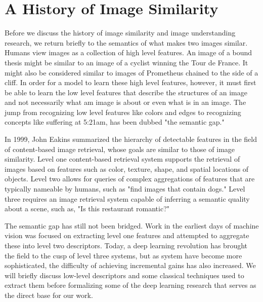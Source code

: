 
\section{A History of Image Similarity}

Before we discuss the history of image similarity and image understanding research, we return briefly to the semantics of what makes two images similar. Humans view images as a collection of high level features. An image of a bound thesis might be similar to an image of a cyclist winning the Tour de France. It might also be considered similar to images of Prometheus chained to the side of a cliff. In order for a model to learn these high level features, however, it must first be able to learn the low level features that describe the structures of an image and not necessarily what am image is about or even what is in an image. The jump from recognizing low level features like colors and edges to recognizing concepts like suffering at 5:21am, has been dubbed "the semantic gap."

In 1999, John Eakins summarized the hierarchy of detectable features in the field of content-based image retrieval, whose goals are similar to those of image similarity.\cite{eakins1999university} Level one content-based retrieval system supports the retrieval of images based on features such as color, texture, shape, and spatial locations of objects. Level two allows for queries of complex aggregations of features that are typically nameable by humans, such as "find images that contain dogs." Level three requires an image retrieval system capable of inferring a semantic quality about a scene, such as, "Is this restaurant romantic?"

The semantic gap has still not been bridged. Work in the earliest days of machine vision was focused on extracting level one features and attempted to aggregate these into level two descriptors. Today, a deep learning revolution has brought the field to the cusp of level three systems, but as system have become more sophisticated, the difficulty of achieving incremental gains has also increased. We will briefly discuss low-level descriptors and some classical techniques used to extract them before formalizing some of the deep learning research that serves as the direct base for our work.

